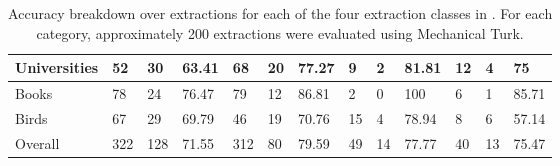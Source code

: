 \begin{table*}[!htb]
\begin{small}
\begin{tabular}{|p{1.5cm}|p{0.8cm}|p{0.8cm}|p{0.65cm}|p{0.8cm}|p{0.8cm}|p{0.65cm}|p{0.8cm}|p{0.8cm}|p{0.65cm}|p{0.8cm}|p{0.8cm}|p{0.65cm}|}
\hline
Universities & 52 & 30 & 63.41 & 68 & 20 & 77.27 & 9 & 2 & 81.81 & 12 & 4 & 75 \\
\hline
Books & 78 & 24 & 76.47 & 79 & 12 & 86.81 & 2 & 0 & 100 & 6  & 1  & 85.71 \\
\hline
Birds & 67 & 29 & 69.79 & 46 & 19 & 70.76 & 15 & 4 & 78.94 & 8 & 6 & 57.14 \\
\hline
\hline
Overall & 322	 & 128 & 71.55 & 312 & 80 & 79.59 & 49 & 14 & 77.77 & 40 & 13 & 75.47 \\
\hline
\end{tabular}
\caption{\label{table:precision}Accuracy breakdown over \system{} extractions for each of the four extraction classes in . For each category, approximately 200 extractions were evaluated using Mechanical Turk.}
\end{small}
\end{table*}
